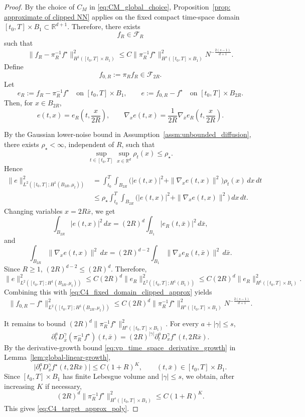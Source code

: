\documentclass[11pt]{article}
\theoremstyle{plain}
\theoremstyle{definition}
\theoremstyle{remark}
\begin{document}
\begin{proof}
By the choice of \(C_M\) in \eqref{eq:CM_global_choice}, Proposition~\ref{prop: approximate of clipped NN}
applies on the fixed compact time-space domain
\([t_0,T]\times B_1\subset\mathbb R^{d+1}\). Therefore, there exists
\[
f_R\in\mathcal F_R
\]
such that
\begin{equation}
\label{eq:C4_fixed_domain_clipped_approx}
\|f_R-\pi_R^{-1}f^\star\|_{H^1([t_0,T]\times B_1)}^2
\le
C
\|\pi_R^{-1}f^\star\|_{H^s([t_0,T]\times B_1)}^2
N^{-\frac{2(s-1)}{d+1}}.
\end{equation}
Define
\[
f_{0,R}:=\pi_R f_R\in\mathcal F_{2R}.
\]
Let
\[
e_R:=f_R-\pi_R^{-1}f^\star
\quad\text{on }[t_0,T]\times B_1,
\qquad
e:=f_{0,R}-f^\star
\quad\text{on }[t_0,T]\times B_{2R}.
\]
Then, for \(x\in B_{2R}\),
\[
e(t,x)
=
e_R\!\left(t,\frac{x}{2R}\right),
\qquad
\nabla_x e(t,x)
=
\frac1{2R}
\nabla_{\bar x}e_R\!\left(t,\frac{x}{2R}\right).
\]

By the Gaussian lower-noise bound in Assumption~\ref{assm:unbounded_diffusion},
there exists \(\rho_\star<\infty\), independent of \(R\), such that
\[
\sup_{t\in[t_0,T]}\sup_{x\in\mathbb R^d}\rho_t(x)\le \rho_\star.
\]
Hence
\[
\begin{aligned}
\|e\|_{L^2([t_0,T];H^1(B_{2R},\mu_t))}^2
&=
\int_{t_0}^T\int_{B_{2R}}
\big(|e(t,x)|^2+\|\nabla_xe(t,x)\|^2\big)\rho_t(x)\,dx\,dt  \\
&\le
\rho_\star
\int_{t_0}^T\int_{B_{2R}}
\big(|e(t,x)|^2+\|\nabla_xe(t,x)\|^2\big)\,dx\,dt.
\end{aligned}
\]
Changing variables \(x=2R\bar x\), we get
\[
\int_{B_{2R}}|e(t,x)|^2\,dx
=
(2R)^d\int_{B_1}|e_R(t,\bar x)|^2\,d\bar x,
\]
and
\[
\int_{B_{2R}}\|\nabla_xe(t,x)\|^2\,dx
=
(2R)^{d-2}
\int_{B_1}\|\nabla_{\bar x}e_R(t,\bar x)\|^2\,d\bar x.
\]
Since \(R\ge1\), \((2R)^{d-2}\le (2R)^d\). Therefore,
\[
\|e\|_{L^2([t_0,T];H^1(B_{2R},\mu_t))}^2
\le
C(2R)^d
\|e_R\|_{L^2([t_0,T];H^1(B_1))}^2
\le
C(2R)^d
\|e_R\|_{H^1([t_0,T]\times B_1)}^2.
\]
Combining this with \eqref{eq:C4_fixed_domain_clipped_approx} yields
\[
\|f_{0,R}-f^\star\|_{L^2([t_0,T];H^1(B_{2R},\mu_t))}^2
\le
C(2R)^d
\|\pi_R^{-1}f^\star\|_{H^s([t_0,T]\times B_1)}^2
N^{-\frac{2(s-1)}{d+1}}.
\]

It remains to bound
\(
(2R)^d
\|\pi_R^{-1}f^\star\|_{H^s([t_0,T]\times B_1)}^2.
\) For every \(a+|\gamma|\le s\),
\[
\partial_t^aD_{\bar x}^{\gamma}(\pi_R^{-1}f^\star)(t,\bar x)
=
(2R)^{|\gamma|}
\partial_t^aD_x^\gamma f^\star(t,2R\bar x).
\]
By the derivative-growth bound \eqref{eq:vp_time_space_derivative_growth} in
Lemma~\ref{lem:global-linear-growth},
\[
\big|
\partial_t^aD_x^\gamma f^\star(t,2R\bar x)
\big|
\le
C(1+R)^K,
\qquad
(t,\bar x)\in [t_0,T]\times B_1.
\]
Since \([t_0,T]\times B_1\) has finite Lebesgue volume and \(|\gamma|\le s\), we obtain,
after increasing \(K\) if necessary,
\[
(2R)^d
\|\pi_R^{-1}f^\star\|_{H^s([t_0,T]\times B_1)}^2
\le
C(1+R)^K.
\]
This gives
\eqref{eq:C4_target_approx_poly}.
\end{proof}
\end{document}
